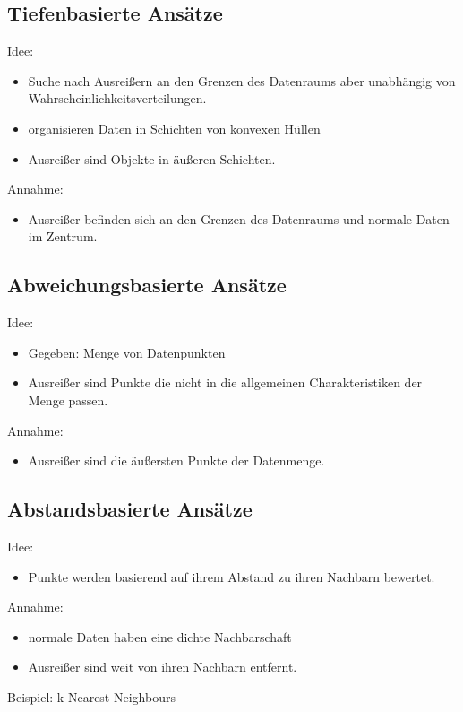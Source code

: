 \documentclass{article} %
\begin{document}
\subsection{Tiefenbasierte Ansätze}
Idee:
\begin{itemize}
	\item Suche nach Ausreißern an den Grenzen des Datenraums aber unabhängig von Wahrscheinlichkeitsverteilungen.\\
    \item organisieren Daten in Schichten von konvexen Hüllen
    \item Ausreißer sind Objekte in äußeren Schichten.
\end{itemize}
Annahme:
\begin{itemize}
	\item Ausreißer befinden sich an den Grenzen des Datenraums und normale Daten im Zentrum.
\end{itemize}
\subsection{Abweichungsbasierte Ansätze}
Idee:
\begin{itemize}
	\item Gegeben: Menge von Datenpunkten
    \item Ausreißer sind Punkte die nicht in die allgemeinen Charakteristiken der Menge passen.
\end{itemize}
Annahme:
\begin{itemize}
	\item Ausreißer sind die äußersten Punkte der Datenmenge.
\end{itemize}
\subsection{Abstandsbasierte Ansätze}
Idee:
\begin{itemize}
	\item Punkte werden basierend auf ihrem Abstand zu ihren Nachbarn bewertet. 
\end{itemize}
Annahme:
\begin{itemize}
	\item normale Daten haben eine dichte Nachbarschaft
    \item Ausreißer sind weit von ihren Nachbarn entfernt.
\end{itemize}
Beispiel: k-Nearest-Neighbours
\end{document}
